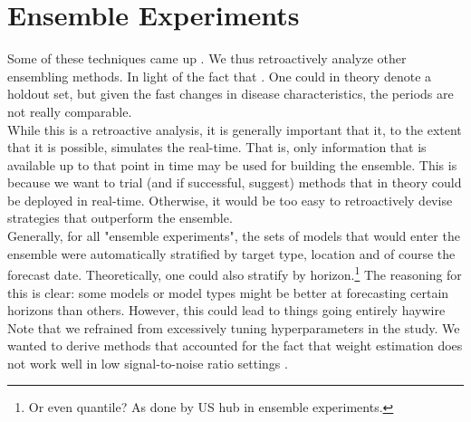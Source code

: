 \newpage
\section{Ensemble Experiments}
Some of these techniques came up . We thus retroactively analyze other ensembling methods. In light of the fact that . One could in theory denote a holdout set, but given the fast changes in disease characteristics, the periods are not really comparable.\\ 
While this is a retroactive analysis, it is generally important that it, to the extent that it is possible, simulates the real-time. That is, only information that is available up to that point in time may be used for building the ensemble. This is because we want to trial (and if successful, suggest) methods that in theory could be deployed in real-time. Otherwise, it would be too easy to retroactively devise strategies that outperform the ensemble.\\
Generally, for all "ensemble experiments", the sets of models that would enter the ensemble were automatically stratified by target type, location and of course the forecast date. Theoretically, one could also stratify by horizon.\footnote{Or even quantile? As done by US hub in ensemble experiments.} The reasoning for this is clear: some models or model types might be better at forecasting certain horizons than others. However, this could lead to things going entirely haywire \\
Note that we refrained from excessively tuning hyperparameters in the study.
We wanted to derive methods that accounted for the fact that weight estimation does not work well in low signal-to-noise ratio settings \cite{claeskens_forecast_2016}.\\
